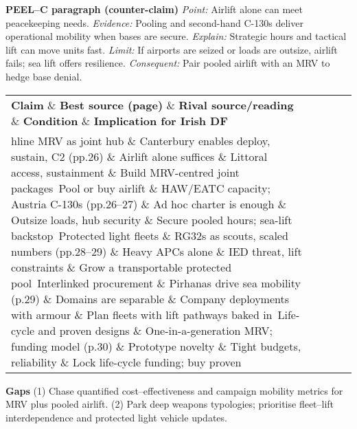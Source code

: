 \textbf{PEEL–C paragraph (counter-claim)}
\textit{Point:} Airlift alone can meet peacekeeping needs.
\textit{Evidence:} Pooling and second-hand C-130s deliver operational mobility when bases are secure.
\textit{Explain:} Strategic hours and tactical lift can move units fast.
\textit{Limit:} If airports are seized or loads are outsize, airlift fails; sea lift offers resilience.
\textit{Consequent:} Pair pooled airlift with an MRV to hedge base denial.

 
\begin{tabular}{p{3.2cm}p{4.2cm}p{3.6cm}p{3.2cm}p{4.2cm}}
	\textbf{Claim} \& \textbf{Best source (page)} \& \textbf{Rival source/reading} \& \textbf{Condition} \& \textbf{Implication for Irish DF}\\hline
	MRV as joint hub \& Canterbury enables deploy, sustain, C2 (pp.26) \& Airlift alone suffices \& Littoral access, sustainment \& Build MRV-centred joint packages\
	Pool or buy airlift \& HAW/EATC capacity; Austria C-130s (pp.26–27) \& Ad hoc charter is enough \& Outsize loads, hub security \& Secure pooled hours; sea-lift backstop\
	Protected light fleets \& RG32s as scouts, scaled numbers (pp.28–29) \& Heavy APCs alone \& IED threat, lift constraints \& Grow a transportable protected pool\
	Interlinked procurement \& Pirhanas drive sea mobility (p.29) \& Domains are separable \& Company deployments with armour \& Plan fleets with lift pathways baked in\
	Life-cycle and proven designs \& One-in-a-generation MRV; funding model (p.30) \& Prototype novelty \& Tight budgets, reliability \& Lock life-cycle funding; buy proven\
\end{tabular}

\textbf{Gaps}
(1) Chase quantified cost–effectiveness and campaign mobility metrics for MRV plus pooled airlift.
(2) Park deep weapons typologies; prioritise fleet–lift interdependence and protected light vehicle updates.

\parencite{GRAY_2002}

